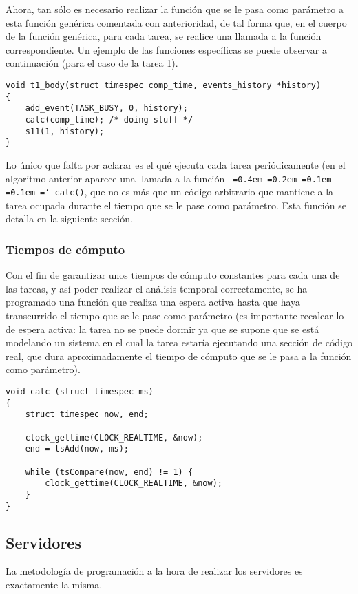 \documentclass[11pt,spanish]{article}
\newcommand*\justify{%
  \fontdimen2\font=0.4em%
  \fontdimen3\font=0.2em%
  \fontdimen4\font=0.1em%
  \fontdimen7\font=0.1em%
  \hyphenchar\font=`\-%
}
\newcommand{\code}[1]{\texttt{\justify #1}}
\begin{document}
Ahora, tan sólo es necesario realizar la función que se le pasa como parámetro a esta 
función genérica comentada con anterioridad, de tal forma que, en el cuerpo de la función 
genérica, para cada tarea, se realice una llamada a la función correspondiente. Un ejemplo de las 
funciones específicas se puede observar a continuación (para el caso de la tarea 1).

\begin{lstlisting}[style=c]
void t1_body(struct timespec comp_time, events_history *history)
{
    add_event(TASK_BUSY, 0, history);
    calc(comp_time); /* doing stuff */ 
    s11(1, history);
}
\end{lstlisting}

Lo único que falta por aclarar es el qué ejecuta cada tarea periódicamente (en el algoritmo
anterior aparece una llamada a la función \code{calc()}, que no es más que un código arbitrario 
que mantiene a la tarea ocupada durante el tiempo que se le pase como parámetro. 
Esta función se detalla en la siguiente sección.

\subsubsection{Tiempos de cómputo}
Con el fin de garantizar unos tiempos de cómputo constantes para cada una de las tareas, y así 
poder realizar el análisis temporal correctamente, se ha programado una función que 
realiza una espera activa hasta que haya transcurrido el tiempo que se le pase como parámetro 
(es importante recalcar lo de espera activa: la tarea no se puede dormir ya que se supone que 
se está modelando un sistema en el cual la tarea estaría ejecutando una sección de código real, 
que dura aproximadamente el tiempo de cómputo que se le pasa a la función como parámetro).

\begin{lstlisting}[style=c]
void calc (struct timespec ms) 
{
    struct timespec now, end;

    clock_gettime(CLOCK_REALTIME, &now);   
    end = tsAdd(now, ms);

    while (tsCompare(now, end) != 1) {
        clock_gettime(CLOCK_REALTIME, &now);
    }
}
\end{lstlisting}

\subsection{Servidores}
La metodología de programación a la hora de realizar los servidores es exactamente
la misma. 
\end{document}

